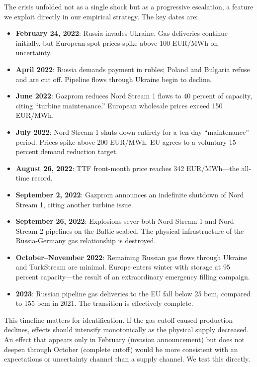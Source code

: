 \documentclass[12pt]{article}
\begin{document}
The crisis unfolded not as a single shock but as a progressive escalation, a feature we exploit directly in our empirical strategy. The key dates are:

\begin{itemize}
    \item \textbf{February 24, 2022}: Russia invades Ukraine. Gas deliveries continue initially, but European spot prices spike above 100 EUR/MWh on uncertainty.
    \item \textbf{April 2022}: Russia demands payment in rubles; Poland and Bulgaria refuse and are cut off. Pipeline flows through Ukraine begin to decline.
    \item \textbf{June 2022}: Gazprom reduces Nord Stream 1 flows to 40 percent of capacity, citing ``turbine maintenance.'' European wholesale prices exceed 150 EUR/MWh.
    \item \textbf{July 2022}: Nord Stream 1 shuts down entirely for a ten-day ``maintenance'' period. Prices spike above 200 EUR/MWh. EU agrees to a voluntary 15 percent demand reduction target.
    \item \textbf{August 26, 2022}: TTF front-month price reaches 342 EUR/MWh---the all-time record.
    \item \textbf{September 2, 2022}: Gazprom announces an indefinite shutdown of Nord Stream 1, citing another turbine issue.
    \item \textbf{September 26, 2022}: Explosions sever both Nord Stream 1 and Nord Stream 2 pipelines on the Baltic seabed. The physical infrastructure of the Russia-Germany gas relationship is destroyed.
    \item \textbf{October--November 2022}: Remaining Russian gas flows through Ukraine and TurkStream are minimal. Europe enters winter with storage at 95 percent capacity---the result of an extraordinary emergency filling campaign.
    \item \textbf{2023}: Russian pipeline gas deliveries to the EU fall below 25 bcm, compared to 155 bcm in 2021. The transition is effectively complete.
\end{itemize}

This timeline matters for identification. If the gas cutoff caused production declines, effects should intensify monotonically as the physical supply decreased. An effect that appears only in February (invasion announcement) but does not deepen through October (complete cutoff) would be more consistent with an expectations or uncertainty channel than a supply channel. We test this directly.
\end{document}
